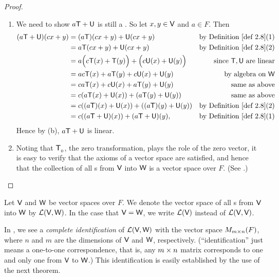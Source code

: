 \begin{proof} \ 
\begin{enumerate}
\item We need to show \(a\textsf{T} + \textsf{U}\) is still a \LTRAN{}.
So let \(x, y \in \textsf{V}\) and \(a \in F\).
Then
\begin{align*}
    (a\T + \U)(cx + y) & = (a\T)(cx + y) + \U(cx + y) & \text{by \DEF{2.8}(1)} \\
                       & = a\T(cx + y) + \U(cx + y) & \text{by \DEF{2.8}(2)} \\
                       & = a\Big( c\T(x) + \T(y) \Big) + \Big( c\U(x) + \U(y) \Big) & \text{since \(\T, \U\) are linear} \\
                       & = ac\T(x) + a\T(y) + c\U(x) + \U(y) & \text{by algebra on \(\W\)} \\
                       & = ca\T(x) + c\U(x) + a\T(y) + \U(y) & \text{same as above} \\
                       & = c(a\T(x) + \U(x)) + (a\T(y) + \U(y)) &
                       \text{same as above} \\
                       & = c((a\T)(x) + \U(x)) + ((a\T)(y) + \U(y)) & \text{by \DEF{2.8}(2)} \\
                       & = c((a\T + \U)(x)) + (a\T + \U)(y), & \text{by \DEF{2.8}(1)}
\end{align*}
Hence by (b), \(a\textsf{T} + \textsf{U}\) is linear.

\item
Noting that \(\textsf{T}_{_0}\), the zero transformation, plays the role of the zero vector, it is easy to verify that the axioms of a vector space are satisfied, and hence that the collection of all \LTRAN{}s from \(\textsf{V}\) into \(\textsf{W}\) is a vector space over \(F\).
(See \EXEC{2.1.6}.)
\end{enumerate}
\end{proof}

\begin{definition} \label{def 2.9}
Let \(\textsf{V}\) and \(\textsf{W}\) be vector spaces over \(F\).
We denote the vector space of all \LTRAN{}s from \(\textsf{V}\) into \(\textsf{W}\) by \(\mathcal{L}(\textsf{V}, \textsf{W})\).
In the case that \(\textsf{V} = \textsf{W}\), we write \(\mathcal{L}(\textsf{V})\) instead of \(\mathcal{L}(\textsf{V}, \textsf{V})\).
\end{definition}

\begin{remark} \label{remark 2.2.3}
In , we see a \emph{complete identification} of \(\mathcal{L}(\textsf{V}, \textsf{W})\) with the vector space \(M_{m \times n}(F)\), where \(n\) and \(m\) are the dimensions of \(\textsf{V}\) and \(\textsf{W}\), respectively.
(``identification'' just means a one-to-one correspondence, that is, any \(m \times n\) matrix corresponds to one and only one \LTRAN{} from \(\textsf{V}\) to \(\textsf{W}\).)
This identification is easily established by the use of the next theorem.
\end{remark}

